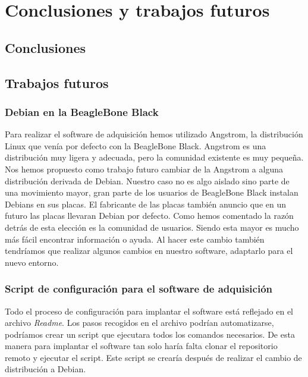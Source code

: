 \chapter{Conclusiones y trabajos futuros}
\label{cap_conclusiones}

\section{Conclusiones}
\section{Trabajos futuros}
	\subsection{Debian en la BeagleBone Black}
	Para realizar el software de adquisición hemos utilizado Angstrom, la distribución Linux que venía por defecto con la BeagleBone Black.
	Angstrom es una distribución muy ligera y adecuada, pero la comunidad existente es muy pequeña. Nos hemos propuesto como trabajo futuro
	cambiar de la Angstrom a alguna distribución derivada de Debian. Nuestro caso no es algo aislado sino parte de una movimiento mayor, gran
	parte de los usuarios  de BeagleBone Black instalan Debians en sus placas. El fabricante de las placas también anuncio que en un futuro las
	placas llevaran Debian por defecto. Como hemos comentado la razón detrás de esta elección es la comunidad de usuarios. Siendo esta mayor es
	mucho más fácil encontrar información o ayuda. Al hacer este cambio también tendríamos que realizar algunos cambios en nuestro software,
	adaptarlo para el nuevo entorno.
	\subsection{Script de configuración para el software de adquisición}
	Todo el proceso de configuración para implantar el software está reflejado en el archivo \emph{Readme}. Los pasos recogidos en el archivo
	podrían automatizarse, podríamos crear un script que ejecutara todos los comandos necesarios. De esta manera para implantar el software tan
	solo haría falta clonar el repositorio remoto y ejecutar el script. Este script se crearía después de realizar el cambio de distribución a
	Debian.
